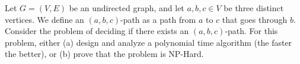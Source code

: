 \documentclass{article}
\begin{document}
\setcounter{section}{17}
\setcounter{exercise}{2}
\begin{exercise}
Let \( G=(V,E) \) be an undirected graph, and let \( a, b, c \in V \) be three distinct vertices.
We define an \( (a, b, c) \)-path as a path from \( a \) to \( c \) that goes through \( b \).
Consider the problem of deciding if there exists an \( (a, b, c) \)-path.
For this problem, either (a) design and analyze a polynomial time algorithm (the faster the better), or (b) prove that the problem is NP-Hard.
\end{exercise}

\begin{solution}

\end{solution}
\pagebreak
\end{document}
